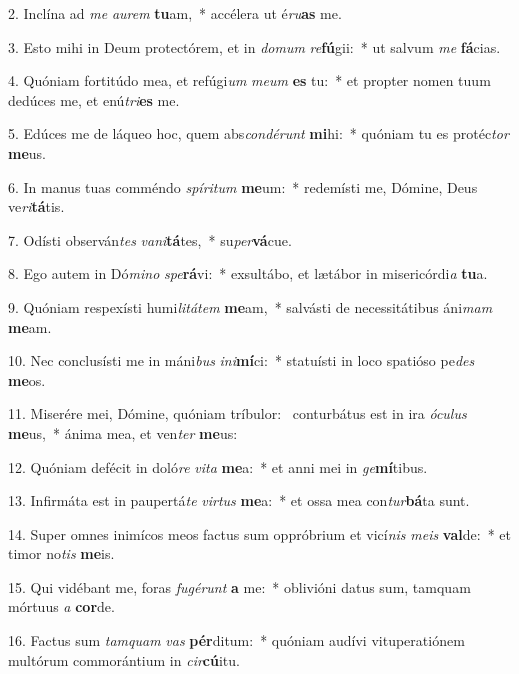2. Inclína ad \textit{me} \textit{au}\textit{rem} \textbf{tu}am,~*  accélera ut é\textit{ru}\textbf{as} me.\

3. Esto mihi in Deum protectórem, et in \textit{do}\textit{mum} \textit{re}\textbf{fú}gii:~*  ut salvum \textit{me} \textbf{fá}cias.\

4. Quóniam fortitúdo mea, et refúgi\textit{um} \textit{me}\textit{um} \textbf{es} tu:~*  et propter nomen tuum dedúces me, et enú\textit{tri}\textbf{es} me.\

5. Edúces me de láqueo hoc, quem abs\textit{con}\textit{dé}\textit{runt} \textbf{mi}hi:~*  quóniam tu es protéc\textit{tor} \textbf{me}us.\

6. In manus tuas comméndo \textit{spí}\textit{ri}\textit{tum} \textbf{me}um:~*  redemísti me, Dómine, Deus ve\textit{ri}\textbf{tá}tis.\

7. Odísti observán\textit{tes} \textit{va}\textit{ni}\textbf{tá}tes,~*  su\textit{per}\textbf{vá}cue.\

8. Ego autem in Dó\textit{mi}\textit{no} \textit{spe}\textbf{rá}vi:~*  exsultábo, et lætábor in misericórdi\textit{a} \textbf{tu}a.\

9. Quóniam respexísti humi\textit{li}\textit{tá}\textit{tem} \textbf{me}am,~*  salvásti de necessitátibus áni\textit{mam} \textbf{me}am.\

10. Nec conclusísti me in máni\textit{bus} \textit{in}\textit{i}\textbf{mí}ci:~*  statuísti in loco spatióso pe\textit{des} \textbf{me}os.\

11. Miserére mei, Dómine, quóniam tríbulor: \dag\  conturbátus est in ira \textit{ó}\textit{cu}\textit{lus} \textbf{me}us,~*  ánima mea, et ven\textit{ter} \textbf{me}us:\

12. Quóniam defécit in doló\textit{re} \textit{vi}\textit{ta} \textbf{me}a:~*  et anni mei in \textit{ge}\textbf{mí}tibus.\

13. Infirmáta est in paupertá\textit{te} \textit{vir}\textit{tus} \textbf{me}a:~*  et ossa mea con\textit{tur}\textbf{bá}ta sunt.\

14. Super omnes inimícos meos factus sum oppróbrium et vicí\textit{nis} \textit{me}\textit{is} \textbf{val}de:~*  et timor no\textit{tis} \textbf{me}is.\

15. Qui vidébant me, foras \textit{fu}\textit{gé}\textit{runt} \textbf{a} me:~*  oblivióni datus sum, tamquam mórtuus \textit{a} \textbf{cor}de.\

16. Factus sum \textit{tam}\textit{quam} \textit{vas} \textbf{pér}ditum:~*  quóniam audívi vituperatiónem multórum commorántium in \textit{cir}\textbf{cú}itu.\

